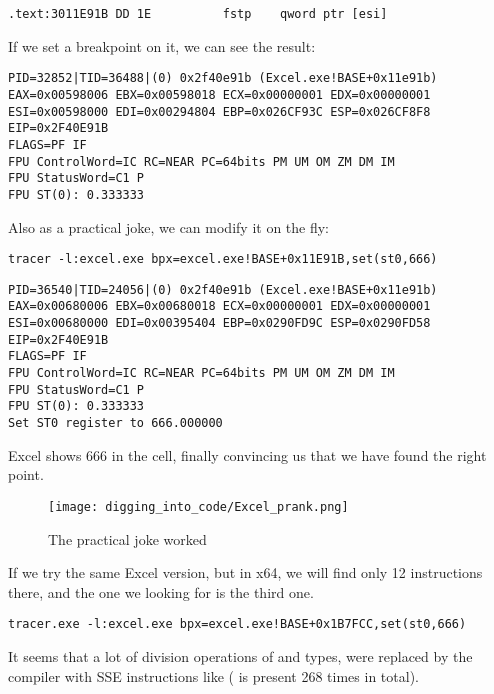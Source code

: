 \begin{lstlisting}[style=customasmx86]
.text:3011E91B DD 1E          fstp    qword ptr [esi]
\end{lstlisting}

If we set a breakpoint on it, we can see the result:

\begin{lstlisting}
PID=32852|TID=36488|(0) 0x2f40e91b (Excel.exe!BASE+0x11e91b)
EAX=0x00598006 EBX=0x00598018 ECX=0x00000001 EDX=0x00000001
ESI=0x00598000 EDI=0x00294804 EBP=0x026CF93C ESP=0x026CF8F8
EIP=0x2F40E91B
FLAGS=PF IF
FPU ControlWord=IC RC=NEAR PC=64bits PM UM OM ZM DM IM 
FPU StatusWord=C1 P 
FPU ST(0): 0.333333
\end{lstlisting}

Also as a practical joke, we can modify it on the fly:

\begin{lstlisting}
tracer -l:excel.exe bpx=excel.exe!BASE+0x11E91B,set(st0,666)
\end{lstlisting}

\begin{lstlisting}
PID=36540|TID=24056|(0) 0x2f40e91b (Excel.exe!BASE+0x11e91b)
EAX=0x00680006 EBX=0x00680018 ECX=0x00000001 EDX=0x00000001
ESI=0x00680000 EDI=0x00395404 EBP=0x0290FD9C ESP=0x0290FD58
EIP=0x2F40E91B
FLAGS=PF IF
FPU ControlWord=IC RC=NEAR PC=64bits PM UM OM ZM DM IM 
FPU StatusWord=C1 P 
FPU ST(0): 0.333333
Set ST0 register to 666.000000
\end{lstlisting}

Excel shows 666 in the cell, finally convincing us that we have found the right point.

\begin{figure}[H]
\centering
\texttt{[image: digging\_into\_code/Excel\_prank.png]}
\caption{The practical joke worked}
\end{figure}

If we try the same Excel version, but in x64,
we will find only 12 \FDIV instructions there,
and the one we looking for is the third one.

\begin{lstlisting}
tracer.exe -l:excel.exe bpx=excel.exe!BASE+0x1B7FCC,set(st0,666)
\end{lstlisting}


It seems that a lot of division operations of \Tfloat and \Tdouble types, were replaced by the compiler with SSE instructions
like  ( is present 268 times in total).

